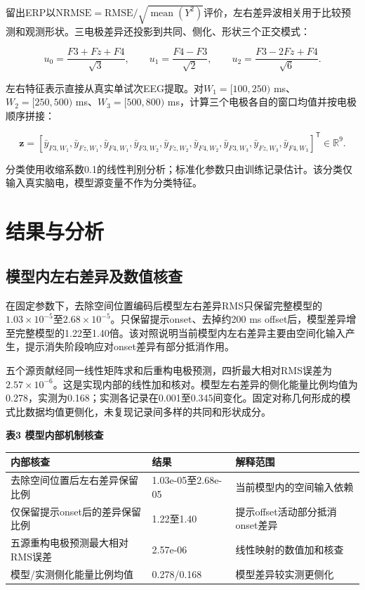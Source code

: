 留出ERP以\(\mathrm{NRMSE}=\mathrm{RMSE}/\sqrt{\operatorname{mean}(Y^2)}\)评价，左右差异波相关用于比较预测和观测形状。三电极差异还投影到共同、侧化、形状三个正交模式：

\[
u_0=\frac{F3+Fz+F4}{\sqrt3},\qquad
u_1=\frac{F4-F3}{\sqrt2},\qquad
u_2=\frac{F3-2Fz+F4}{\sqrt6}.
\]

左右特征表示直接从真实单试次EEG提取。对\(W_1=[100,250)\) ms、\(W_2=[250,500)\) ms、\(W_3=[500,800)\) ms，计算三个电极各自的窗口均值并按电极顺序拼接：

\[
\mathbf z=\left[
\bar y_{F3,W_1},\bar y_{Fz,W_1},\bar y_{F4,W_1},
\bar y_{F3,W_2},\bar y_{Fz,W_2},\bar y_{F4,W_2},
\bar y_{F3,W_3},\bar y_{Fz,W_3},\bar y_{F4,W_3}
\right]^{\mathsf T}\in\mathbb R^9.
\]

分类使用收缩系数0.1的线性判别分析；标准化参数只由训练记录估计。该分类仅输入真实脑电，模型源变量不作为分类特征。

\hypertarget{ux7ed3ux679cux4e0eux5206ux6790}{%
\section{结果与分析}\label{ux7ed3ux679cux4e0eux5206ux6790}}

\hypertarget{ux6a21ux578bux5185ux5de6ux53f3ux5deeux5f02ux53caux6570ux503cux6838ux67e5}{%
\subsection{模型内左右差异及数值核查}\label{ux6a21ux578bux5185ux5de6ux53f3ux5deeux5f02ux53caux6570ux503cux6838ux67e5}}

在固定参数下，去除空间位置编码后模型左右差异RMS只保留完整模型的\(1.03\times10^{-5}\)至\(2.68\times10^{-5}\)。只保留提示onset、去掉约200 ms offset后，模型差异增至完整模型的1.22至1.40倍。该对照说明当前模型内左右差异主要由空间化输入产生，提示消失阶段响应对onset差异有部分抵消作用。

五个源贡献经同一线性矩阵求和后重构电极预测，四折最大相对RMS误差为\(2.57\times10^{-6}\)。这是实现内部的线性加和核对。模型左右差异的侧化能量比例均值为0.278，实测为0.168；实测各记录在0.001至0.345间变化。固定对称几何形成的模式比数据均值更侧化，未复现记录间多样的共同和形状成分。

\textbf{表3 模型内部机制核查}

\begin{longtable}[]{@{}lll@{}}
\toprule
内部核查 & 结果 & 解释范围 \\
\midrule
\endhead
去除空间位置后左右差异保留比例 & 1.03e-05至2.68e-05 & 当前模型内的空间输入依赖 \\
仅保留提示onset后的差异保留比例 & 1.22至1.40 & 提示offset活动部分抵消onset差异 \\
五源重构电极预测最大相对RMS误差 & 2.57e-06 & 线性映射的数值加和核查 \\
模型/实测侧化能量比例均值 & 0.278/0.168 & 模型差异较实测更侧化 \\
\bottomrule
\end{longtable}

